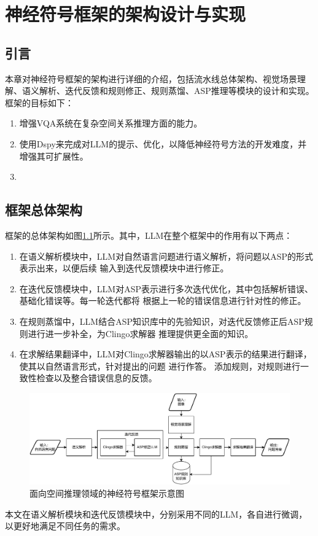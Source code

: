 \chapter{神经符号框架的架构设计与实现}
\section{引言}
本章对神经符号框架的架构进行详细的介绍，包括流水线总体架构、视觉场景理解、语义解析、迭代反馈和规则修正、规则蒸馏、ASP推理等模块的设计和实现。
框架的目标如下：
\begin{enumerate}[label=(\arabic*),itemsep=0pt,parsep=0pt]
\item 增强VQA系统在复杂空间关系推理方面的能力。
\item 使用Dspy来完成对LLM的提示、优化，以降低神经符号方法的开发难度，并增强其可扩展性。
\item 
\end{enumerate}
\section{框架总体架构}
框架的总体架构如图\ref{fig:pipeline}所示。其中，LLM在整个框架中的作用有以下两点：
\begin{enumerate}[label=(\arabic*),itemsep=0pt,parsep=0pt]
    \item 在语义解析模块中，LLM对自然语言问题进行语义解析，将问题以ASP的形式表示出来，以便后续
输入到迭代反馈模块中进行修正。
    \item 在迭代反馈模块中，LLM对ASP表示进行多次迭代优化，其中包括解析错误、基础化错误等。每一轮迭代都将
根据上一轮的错误信息进行针对性的修正。
    \item 在规则蒸馏中，LLM结合ASP知识库中的先验知识，对迭代反馈修正后ASP规则进行进一步补全，为Clingo求解器
推理提供更全面的知识。
    \item 在求解结果翻译中，LLM对Clingo求解器输出的以ASP表示的结果进行翻译，使其以自然语言形式，针对提出的问题
进行作答。
添加规则，对规则进行一致性检查以及整合错误信息的反馈。
\end{enumerate}
\begin{figure}
    \centering
    \includegraphics[width=\textwidth]{figures/pipeline-crop.pdf}
    \caption{面向空间推理领域的神经符号框架示意图}
    \label{fig:pipeline}
\end{figure}
本文在语义解析模块和迭代反馈模块中，分别采用不同的LLM，各自进行微调，以更好地满足不同任务的需求。

